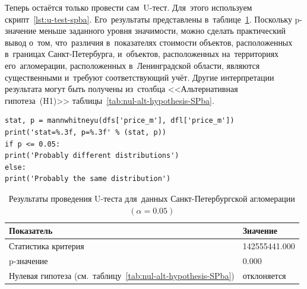 \documentclass[]{scrreprt}
\begin{document}
Теперь остаётся только провести сам~U-тест. Для~этого используем скрипт~\ref{lst:u-test-spba}. Его~результаты представлены в~таблице~\ref{tab:u-test-py-result}. Поскольку p-значение меньше заданного уровня значимости, можно сделать практический вывод о~том, что~различия в~показателях стоимости объектов, расположенных в~границах Санкт-Петербурга, и~объектов, расположенных на~территориях его~агломерации, расположенных в~Ленинградской области, являются существенными и~требуют соответствующий учёт. Другие интерпретации результата могут быть получены из~столбца <<Альтернативная гипотеза~(H1)>> таблицы~\ref{tab:nul-alt-hypothesis-SPba}.
%
\begin{lstlisting}[float, caption = Проведение теста Манна"--~Уитни-Уилкоксона для~данных удельных цен предложения квартир в~агломерации Санкт-Петербурга, firstnumber=1, label= lst:u-test-spba]
stat, p = mannwhitneyu(dfs['price_m'], dfl['price_m'])
print('stat=%.3f, p=%.3f' % (stat, p))
if p <= 0.05:
print('Probably different distributions')
else:
print('Probably the same distribution')
\end{lstlisting}  
%
\begin{table}[ht]
	\caption{Результаты проведения U-теста для~данных Санкт-Петербургской агломерации $({\textstyle \alpha=0.05})$}\label{tab:u-test-py-result}
	\centering
	\begin{tabular}{ll}
		\hline
	Показатель&Значение\\
		\hline
	Статистика критерия&142555441.000\\
		\hline
	p-значение&0.000\\
		\hline
	Нулевая гипотеза (см.~таблицу~\ref{tab:nul-alt-hypothesis-SPba})&отклоняется\\
		\hline
	\end{tabular}
\end{table}

\clearpage
\end{document}

